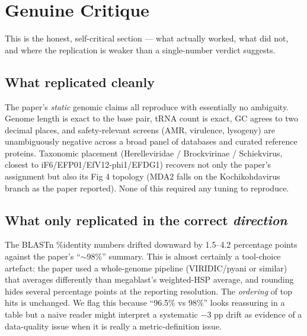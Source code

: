 \documentclass[11pt,letterpaper]{article}
\begin{document}
\section{Genuine Critique}

This is the honest, self-critical section --- what actually worked, what did not, and where the replication is weaker than a single-number verdict suggests.

\subsection*{What replicated cleanly}
The paper's \emph{static} genomic claims all reproduce with essentially no ambiguity. Genome length is exact to the base pair, tRNA count is exact, GC agrees to two decimal places, and safety-relevant screens (AMR, virulence, lysogeny) are unambiguously negative across a broad panel of databases and curated reference proteins. Taxonomic placement (Herelleviridae / Brockvirinae / Schiekvirus, closest to iF6/EFP01/EfV12-phi1/EFDG1) recovers not only the paper's assignment but also its Fig 4 topology (MDA2 falls on the Kochikohdavirus branch as the paper reported). None of this required any tuning to reproduce.

\subsection*{What only replicated in the correct \emph{direction}}
The BLASTn \%identity numbers drifted downward by 1.5--4.2 percentage points against the paper's ``$\sim$98\%'' summary. This is almost certainly a tool-choice artefact: the paper used a whole-genome pipeline (VIRIDIC/pyani or similar) that averages differently than megablast's weighted-HSP average, and rounding hides several percentage points at the reporting resolution. The \emph{ordering} of top hits is unchanged. We flag this because ``96.5\% vs 98\%'' looks reassuring in a table but a naive reader might interpret a systematic $-3$ pp drift as evidence of a data-quality issue when it is really a metric-definition issue.
\end{document}
